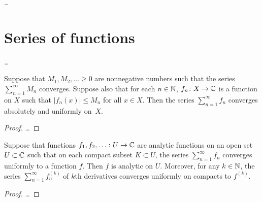 \begin{definition}
  \label{def:complex_series}
  \ldots
\end{definition}



\section{Series of functions}

\begin{definition}
  \label{def:function_series}
  \ldots
\end{definition}

\begin{lemma}
  \label{lem:weierstrass_test}
  Suppose that $M_1,M_2,\ldots \ge 0$ are nonnegative
  numbers such that the series $\sum_{n=1}^\infty M_n$ converges.
  Suppose also that for each $n \in \mathbb{N}$,
  $f_n \colon X \to \mathbb{C}$ is a function on $X$
  such that $|f_n(x)| \le M_n$ for all $x \in X$.
  Then the series $\sum_{n=1}^\infty f_n$
  converges absolutely and uniformly on~$X$.
\end{lemma}
\begin{proof}
  \ldots
\end{proof}

\begin{lemma}
  \label{lem:uoc_convergent_analytic_series}
  \lean{}
  Suppose that functions $f_1, f_2, \ldots \colon U \to \mathbb{C}$
  are analytic functions on an open set $U \subset \mathbb{C}$
  such that on each compact subset $K \subset U$, the series
  $\sum_{n=1}^\infty f_n$ converges uniformly to a
  function $f$. Then $f$ is analytic on $U$.
  Moreover, for any $k \in \mathbb{N}$, the series $\sum_{n=1}^\infty f^{(k)}_n$
  of $k$th derivatives converges uniformly on compacts to $f^{(k)}$.
\end{lemma}
\begin{proof}
  \ldots
\end{proof}



